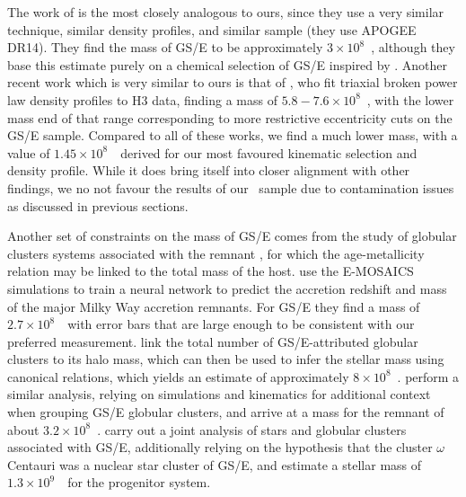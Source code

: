The work of \cite{mackereth20} is the most closely analogous to ours, since they use a very similar technique, similar density profiles, and similar sample (they use APOGEE DR14). They find the mass of GS/E to be approximately $3\times10^{8}$~\Msun, although they base this estimate purely on a chemical selection of GS/E inspired by \textcite{mackereth19a}. Another recent work which is very similar to ours is that of \textcite{han22}, who fit triaxial broken power law density profiles to H3 data, finding a mass of $5.8-7.6\times10^{8}$~\Msun, with the lower mass end of that range corresponding to more restrictive eccentricity cuts on the GS/E sample. Compared to all of these works, we find a much lower mass, with a value of $1.45\times10^{8}$~\Msun\ derived for our most favoured kinematic selection and density profile. While it does bring itself into closer alignment with other findings, we no not favour the results of our \JRLz\ sample due to contamination issues as discussed in previous sections.

Another set of constraints on the mass of GS/E comes from the study of globular clusters systems associated with the remnant \parencite[as tabulated by e.g.][]{myeong18,massari19}, for which the age-metallicity relation may be linked to the total mass of the host. \textcite{kruijssen20} use the E-MOSAICS simulations to train a neural network to predict the accretion redshift and mass of the major Milky Way accretion remnants. For GS/E they find a mass of $2.7\times 10^{8}$~\Msun\ with error bars that are large enough to be consistent with our preferred measurement. \textcite{forbes20} link the total number of GS/E-attributed globular clusters to its halo mass, which can then be used to infer the stellar mass using canonical relations, which yields an estimate of approximately $8\times10^{8}$~\Msun . \textcite{callingham22} perform a similar analysis, relying on simulations and kinematics for additional context when grouping GS/E globular clusters, and arrive at a mass for the remnant of about $3.2\times10^{8}$~\Msun. \textcite{limberg22} carry out a joint analysis of stars and globular clusters associated with GS/E, additionally relying on the hypothesis that the cluster $\omega$ Centauri was a nuclear star cluster of GS/E, and estimate a stellar mass of $1.3\times 10^{9}$~\Msun\ for the progenitor system.

